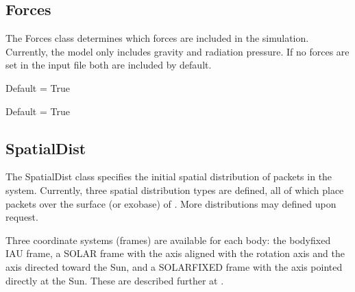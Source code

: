 \documentclass[letterpaper,10pt,english]{sphinxmanual}
\begin{document}
\subsection{Forces}
\label{\detokenize{nexoclom2/inputfiles:forces}}\label{\detokenize{nexoclom2/inputfiles:id2}}
\sphinxAtStartPar
The Forces class determines which forces are included in the simulation.
Currently, the model only includes gravity and radiation pressure. If
no forces are set in the input file both are included by default.
\begin{description}
\sphinxAtStartPar
Default = True

\sphinxAtStartPar
Default = True

\end{description}


\subsection{SpatialDist}
\label{\detokenize{nexoclom2/inputfiles:spatialdist}}\label{\detokenize{nexoclom2/inputfiles:id3}}
\sphinxAtStartPar
The SpatialDist class specifies the initial spatial distribution of packets
in the system. Currently, three spatial distribution types are defined, all of
which place packets over the surface (or exobase) of .
More distributions may defined upon request.

\sphinxAtStartPar
Three coordinate systems (frames) are available for each body: the body\sphinxhyphen{}fixed
IAU frame, a SOLAR frame with the \sphinxhyphen{}axis aligned with the rotation axis and
the \sphinxhyphen{}axis directed toward the Sun, and a SOLARFIXED frame with the \sphinxhyphen{}axis
pointed directly at the Sun. These are described further at
{\hyperref[\detokenize{nexoclom2/coordinate_systems:coordinate-systems}]{}}.
\end{document}
